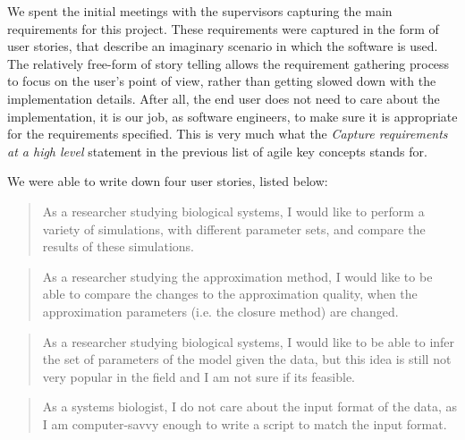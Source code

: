 We spent the initial meetings with the supervisors capturing the main requirements for this project. These requirements were captured in the form of user stories, that describe an imaginary scenario in which the software is used. 
The relatively free-form of story telling allows the requirement gathering process to focus on the user's point of view, rather than getting slowed down with the implementation details. 
After all, the end user does not need to care about the implementation, it is our job, as software engineers, to make sure it is appropriate for the requirements specified.
This is very much what the \emph{Capture requirements at a high level} statement in the previous list of agile key concepts stands for.

We were able to write down four user stories, listed below:

\blockquote{As a researcher studying biological systems, I would like to perform a variety of simulations, with different parameter sets, and compare the results of these simulations.}

\blockquote{As a researcher studying the approximation method, I would like to be able to compare the changes to the approximation quality, when the approximation parameters (i.e. the closure method) are changed.}

\blockquote{As a researcher studying biological systems, I would like to be able to infer the set of parameters of the model given the data, but this idea is still not very popular in the field and I am not sure if its feasible.}

\blockquote{As a systems biologist, I do not care about the input format of the data, as I am computer-savvy enough to write a script to match the input format.}



